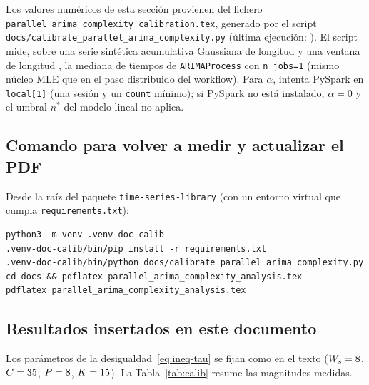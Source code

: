 \documentclass[11pt,a4paper]{article}
\begin{document}
Los valores numéricos de esta sección provienen del fichero
\texttt{parallel\_arima\_complexity\_calibration.tex}, generado por el script
\texttt{docs/calibrate\_parallel\_arima\_complexity.py} (última ejecución:
\texttt{\CalGenAt}). El script mide, sobre una serie sintética acumulativa
Gaussiana de longitud \CalNCal{} y una ventana de longitud \CalLWin{}, la mediana
de tiempos de \texttt{ARIMAProcess}\CalPDQ{} con \texttt{n\_jobs=1} (mismo
núcleo MLE que en el paso distribuido del workflow). Para $\alpha$, intenta
PySpark en \texttt{local[1]} (una sesión y un \texttt{count} mínimo); si PySpark
no está instalado, $\alpha=0$ y el umbral $n^{*}$ del modelo lineal no aplica.

\subsection{Comando para volver a medir y actualizar el PDF}

Desde la raíz del paquete \texttt{time-series-library} (con un entorno virtual
que cumpla \texttt{requirements.txt}):

\begin{verbatim}
python3 -m venv .venv-doc-calib
.venv-doc-calib/bin/pip install -r requirements.txt
.venv-doc-calib/bin/python docs/calibrate_parallel_arima_complexity.py
cd docs && pdflatex parallel_arima_complexity_analysis.tex
pdflatex parallel_arima_complexity_analysis.tex
\end{verbatim}

\subsection{Resultados insertados en este documento}

Los parámetros de la desigualdad~\eqref{eq:ineq-tau} se fijan como en el texto
($W_s=8$, $C=35$, $P=8$, $K=15$). La
Tabla~\ref{tab:calib} resume las magnitudes medidas.
\end{document}
